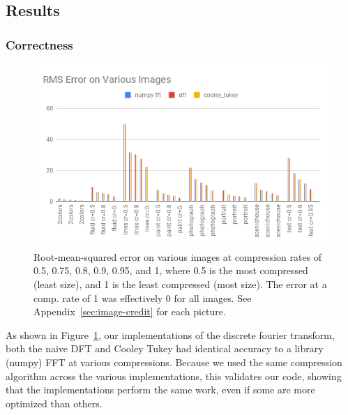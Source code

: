 \subsection{Results}
		\subsubsection{Correctness}
		\begin{figure}[h]
			\vspace{-5mm}
			\includegraphics[width=\linewidth]{images/accuracy.png}
			\caption{Root-mean-squared error on various images at compression rates of 0.5, 0.75, 0.8, 0.9, 0.95, and 1, where 0.5 is the most compressed (least size), and 1 is the least compressed (most size). The error at a comp. rate of 1 was effectively 0 for all images. See Appendix~\ref{sec:image-credit} for each picture.}
			\label{fig:accuracy}
		\end{figure}

		As shown in Figure~\ref{fig:accuracy}, our implementations of the discrete fourier transform, both the naive DFT and Cooley Tukey had identical accuracy to a library (numpy) FFT at various compressions. Because we used the same compression algorithm across the various implementations, this validates our code, showing that the implementations perform the same work, even if some are more optimized than others.

